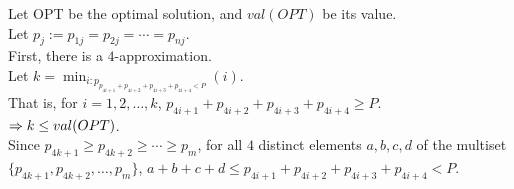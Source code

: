 \begin{pr}
Let OPT be the optimal solution, and $val(OPT)$ be its value.\\
Let $p_j:=p_{1j}=p_{2j}=\cdots=p_{nj}$.\\
First, there is a $4$-approximation.\\
Let $k=\min_{i:p_{p_{4i+1}+p_{4i+2}+p_{4i+3}+p_{4i+4}<P}}(i)$.\\
That is, for $i=1, 2, \dots, k$, $p_{4i+1}+p_{4i+2}+p_{4i+3}+p_{4i+4}\geq P$.\\
$\Rightarrow k\leq val(OPT)$.\\
Since $p_{4k+1}\geq p_{4k+2}\geq\cdots\geq p_m$, for all $4$ distinct elements $a, b, c, d$ of the multiset $\{p_{4k+1}, p_{4k+2}, \dots, p_m\}$, $a+b+c+d\leq p_{4i+1}+p_{4i+2}+p_{4i+3}+p_{4i+4}<P$.\\

\end{pr}
